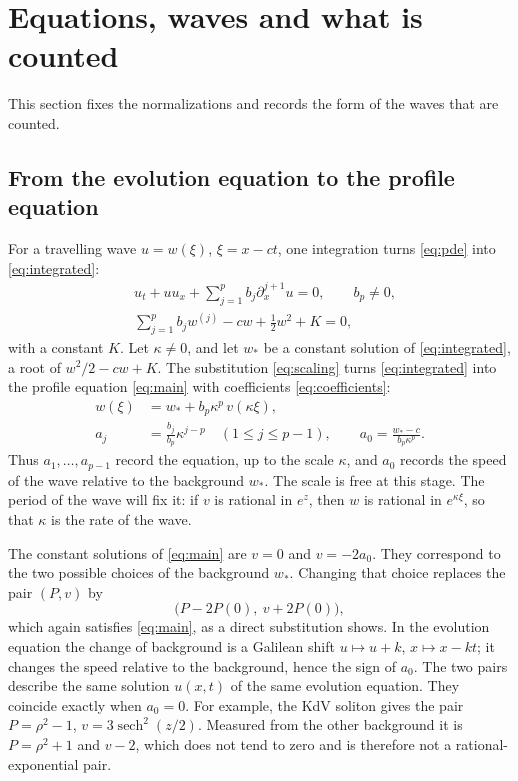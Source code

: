 \section{Equations, waves and what is counted}\label{sec:setting}

This section fixes the normalizations and records the form of the waves
that are counted.

\subsection{From the evolution equation to the profile equation}

For a travelling wave \(u=w(\xi)\), \(\xi=x-ct\), one integration turns
\eqref{eq:pde} into \eqref{eq:integrated}:
\begin{align}
 &u_t+uu_x+\sum_{j=1}^{p}b_j\partial_x^{j+1}u=0,\qquad b_p\ne0,
 \label{eq:pde}\\
 &\sum_{j=1}^{p}b_jw^{(j)}-cw+\frac12w^2+K=0,\label{eq:integrated}
\end{align}
with a constant \(K\). Let \(\kappa\ne0\), and let \(w_\ast\) be a
constant solution of \eqref{eq:integrated}, a root of \(w^2/2-cw+K\).
The substitution \eqref{eq:scaling} turns \eqref{eq:integrated} into the
profile equation \eqref{eq:main} with coefficients
\eqref{eq:coefficients}:
\begin{align}
 w(\xi)&=w_\ast+b_p\kappa^p\,v(\kappa\xi),\label{eq:scaling}\\
 a_j&=\frac{b_j}{b_p}\kappa^{j-p}\quad(1\le j\le p-1),\qquad
 a_0=\frac{w_\ast-c}{b_p\kappa^p}.\label{eq:coefficients}
\end{align}
Thus \(a_1,\ldots,a_{p-1}\) record the equation, up to the scale
\(\kappa\), and \(a_0\) records the speed of the wave relative to the
background \(w_\ast\). The scale is free at this stage. The period of
the wave will fix it: if \(v\) is rational in \(e^{z}\), then \(w\) is
rational in \(e^{\kappa\xi}\), so that \(\kappa\) is the rate of the wave.

The constant solutions of \eqref{eq:main} are \(v=0\) and \(v=-2a_0\).
They correspond to the two possible choices of the background
\(w_\ast\). Changing that choice replaces the pair \((P,v)\) by
\begin{equation}\label{eq:shift}
 \bigl(P-2P(0),\ v+2P(0)\bigr),
\end{equation}
which again satisfies \eqref{eq:main}, as a direct substitution shows.
In the evolution equation the change of background is a Galilean shift
\(u\mapsto u+k\), \(x\mapsto x-kt\); it changes the speed relative to
the background, hence the sign of \(a_0\). The two pairs describe the
same solution \(u(x,t)\) of the same evolution equation. They coincide
exactly when \(a_0=0\). For example, the KdV soliton gives the pair
\(P=\rho^2-1\), \(v=3\operatorname{sech}^2(z/2)\). Measured from the
other background it is \(P=\rho^2+1\) and \(v-2\), which does not tend
to zero and is therefore not a rational-exponential pair.


